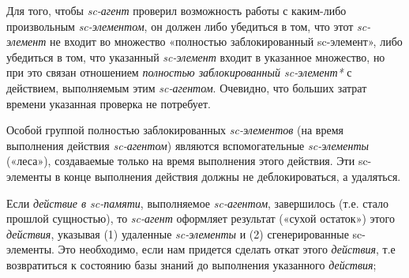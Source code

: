 \begin{SCn}
{\begin{scnitemize}
    Для того, чтобы \textit{sc-агент} проверил возможность работы с каким-либо произвольным \textit{sc-элементом}, он должен либо убедиться в том, что этот \textit{sc-элемент} не входит во множество «полностью заблокированный sc-элемент», либо убедиться в том, что указанный \textit{sc-элемент} входит в указанное множество, но при это связан отношением \textit{полностью заблокированный sc-элемент*} с действием, выполняемым этим \textit{sc-агентом}. Очевидно, что больших затрат времени указанная проверка не потребует.

    Особой группой полностью заблокированных \textit{sc-элементов} (на время выполнения действия \textit{sc-агентом}) являются вспомогательные \textit{sc-элементы} («леса»), создаваемые только на время выполнения этого действия. Эти sc-элементы в конце выполнения действия должны не деблокироваться, а удаляться.
    \item Если \textit{действие в sc-памяти}, выполняемое \textit{sc-агентом}, завершилось (т.е. стало прошлой сущностью), то \textit{sc-агент} оформляет результат («сухой остаток») этого \textit{действия}, указывая (1) удаленные \textit{sc-элементы} и (2) сгенерированные sc-элементы. Это необходимо, если нам придется сделать откат этого \textit{действия}, т.е возвратиться к состоянию базы знаний до выполнения указанного \textit{действия};
\end{scnitemize}
}

\end{SCn}
